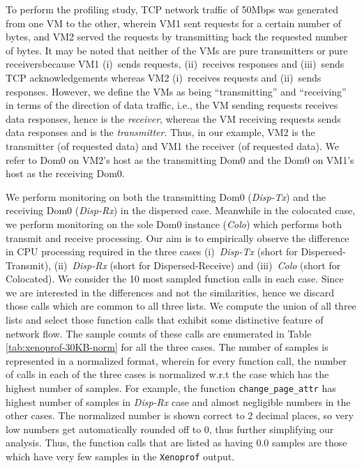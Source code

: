 To perform the profiling study, 
TCP
network traffic of
50Mbps was generated from one VM to the other,
wherein VM1 sent requests for a certain number of bytes, 
and VM2 served the requests
by transmitting back the requested number of bytes. 
It may be noted that neither of the VMs are pure transmitters
or pure receivers\textemdash{}because VM1 (i)~sends requests, (ii)~receives responses
and (iii)~sends TCP acknowledgements whereas VM2 (i)~receives requests and
(ii)~sends responses.
However, we define the VMs as being ``transmitting'' and ``receiving'' 
in terms of the direction of data traffic,
i.e., the VM sending requests receives data responses, 
hence is the \emph{receiver},
whereas the VM receiving requests sends data responses and 
is the \emph{transmitter}.
Thus, in our example, VM2 is the transmitter (of requested data) and 
VM1 the receiver (of requested data). 
We refer to Dom0 on VM2's host as the transmitting Dom0 
and the Dom0 on VM1's host as the receiving Dom0. 

We perform monitoring on both the transmitting Dom0 (\textit{Disp-Tx})
and the receiving Dom0 (\textit{Disp-Rx}) in the dispersed case. 
Meanwhile in the colocated case, we perform monitoring on the 
sole Dom0
instance (\textit{Colo}) which performs both transmit and receive processing.
Our aim is to empirically observe the 
difference in CPU processing required in the three cases
\textemdash{}(i)~\textit{Disp-Tx} (short for Dispersed-Transmit), 
(ii)~\textit{Disp-Rx} (short for Dispersed-Receive) and 
(iii)~\textit{Colo} (short for Colocated).
We consider the 10 most sampled function calls in each case.
Since we are interested in the differences and not the similarities, hence
we discard those calls which are common to all three lists. 
We compute the union of all three lists and select those function
calls that exhibit some distinctive feature of network flow.
The sample counts of these calls are enumerated in Table 
\ref{tab:xenoprof-30KB-norm} for all the three
cases.
The number of samples is represented in a
normalized format, wherein for every function call, the number
of calls in each of the three cases is normalized w.r.t the
case which
has the highest number of samples. For example, the function
\texttt{change\_page\_attr} has highest number of samples
in \textit{Disp-Rx} case and almost negligible numbers in the other
cases. The normalized number is shown correct to 2 decimal 
places, so very low numbers get automatically rounded off to 0,
thus further simplifying our analysis. Thus, the function calls
that are listed as having 0.0 samples are those which have very 
few samples in the \texttt{Xenoprof} output.


